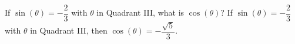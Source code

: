 {If $\sin(\theta) = -\dfrac{2}{3}$ with $\theta$ in Quadrant III, what is $\cos(\theta)$?}
{If $\sin(\theta) = -\dfrac{2}{3}$ with $\theta$ in Quadrant III, then $\cos(\theta) = -\dfrac{\sqrt{5}}{3}$.}